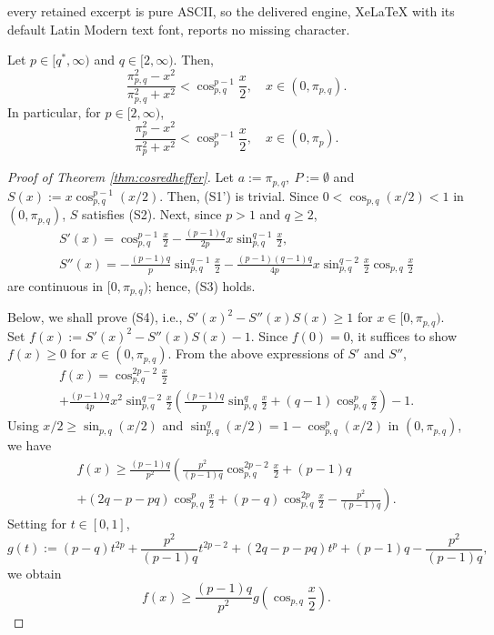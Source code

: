 \documentclass[10pt,a4paper]{amsart}
\begin{document}
every retained excerpt is pure ASCII, so the delivered engine, XeLaTeX with its default Latin Modern text font, reports no missing character.
\begin{thm}
\label{thm:cosredheffer}
Let $p \in [q^*,\infty)$ and $q \in [2,\infty)$. Then,
\[\frac{\pi_{p,q}^2-x^2}{\pi_{p,q}^2+x^2}<\cos_{p,q}^{p-1}{\frac{x}{2}}, \quad x \in (0,\pi_{p,q}).\]
In particular, for $p \in [2,\infty)$,
\[\frac{\pi_p^2-x^2}{\pi_p^2+x^2}<\cos_p^{p-1}{\frac{x}{2}}, \quad x \in (0,\pi_p).\]
\end{thm}

\begin{proof}[Proof of Theorem \ref{thm:cosredheffer}]
Let $a:=\pi_{p,q},\ P:=\emptyset$ and $S(x):=x\cos_{p,q}^{p-1}{(x/2)}$.
Then, (S1') is trivial. 
Since $0<\cos_{p,q}{(x/2)}<1$ in $(0,\pi_{p,q})$, 
$S$ satisfies (S2). Next, since $p>1$ and $q \geq 2$,
\begin{gather*}
S'(x)
=\cos_{p,q}^{p-1}\frac{x}{2}-\frac{(p-1)q}{2p}
x\sin_{p,q}^{q-1}\frac{x}{2},\\
S''(x)
=-\frac{(p-1)q}{p}\sin_{p,q}^{q-1}\frac{x}{2}
-\frac{(p-1)(q-1)q}{4p}x\sin_{p,q}^{q-2}\frac{x}{2}\cos_{p,q}\frac{x}{2}
\end{gather*}
are continuous in $[0,\pi_{p,q})$; hence, (S3) holds.

Below, we shall prove (S4), i.e., $S'(x)^2-S''(x)S(x) \geq 1$ for $x \in [0,\pi_{p,q})$. Set $f(x):=S'(x)^2-S''(x)S(x)-1$.
Since $f(0)=0$, it suffices to show $f(x) \geq 0$ for $x \in (0,\pi_{p,q})$. 
From the above expressions of $S'$ and $S''$,
\begin{multline*}
f(x)
=\cos_{p,q}^{2p-2}\frac{x}{2}\\
+\frac{(p-1)q}{4p}x^2\sin_{p,q}^{q-2}\frac{x}{2}
\left(\frac{(p-1)q}{p}\sin_{p,q}^q\frac{x}{2}
+(q-1)\cos_{p,q}^p\frac{x}{2}\right)-1.
\end{multline*}
Using $x/2 \geq \sin_{p,q}{(x/2)}$
and $\sin_{p,q}^q{(x/2)}=1-\cos_{p,q}^p{(x/2)}$
in $(0,\pi_{p,q})$,
we have
\begin{multline*}
f(x)
\geq \frac{(p-1)q}{p^2}
\left(\frac{p^2}{(p-1)q}\cos_{p,q}^{2p-2}\frac{x}{2}
+(p-1)q \right.\\
\left. +(2q-p-pq)\cos_{p,q}^p\frac{x}{2}
+(p-q)\cos_{p,q}^{2p}\frac{x}{2}
-\frac{p^2}{(p-1)q}\right).
\end{multline*}
Setting for $t \in [0,1]$,
\[g(t):=(p-q)t^{2p}+\frac{p^2}{(p-1)q}t^{2p-2}
+(2q-p-pq)t^p+(p-1)q-\frac{p^2}{(p-1)q},\]
we obtain
\[f(x) \geq \frac{(p-1)q}{p^2}g\left(\cos_{p,q}\frac{x}{2}\right).\]


\end{proof}
\end{document}
